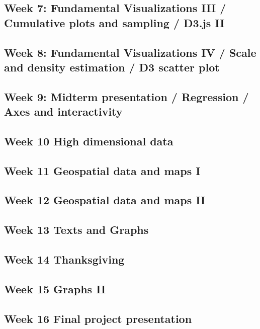 \documentclass[11pt,article,oneside]{memoir} %
\begin{document}
\subsection{Week 7: Fundamental Visualizations III / Cumulative plots and sampling / D3.js II}
\subsection{Week 8: Fundamental Visualizations IV / Scale and density estimation / D3 scatter plot}
\subsection{Week 9: Midterm presentation / Regression / Axes and interactivity}
\subsection{Week 10 High dimensional data}
\subsection{Week 11 Geospatial data and maps I}
\subsection{Week 12 Geospatial data and maps II}
\subsection{Week 13 Texts and Graphs}
\subsection{Week 14 Thanksgiving}
\subsection{Week 15 Graphs II }
\subsection{Week 16 Final project presentation}
\end{document}
